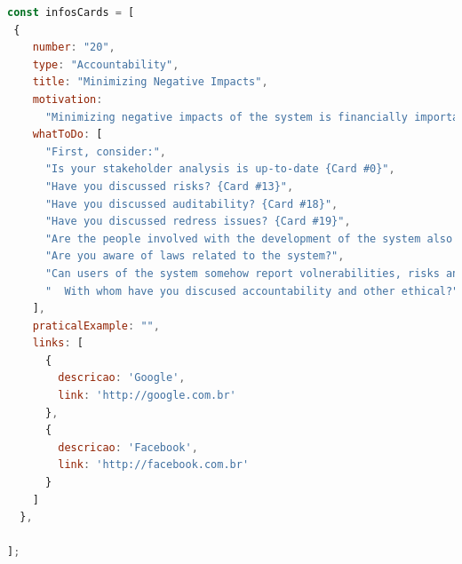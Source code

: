 \begin{lstlisting}[language=JavaScript, caption=Informações referentes ao \textit{card} 20 do ECCOLA.]
const infosCards = [
 {
    number: "20",
    type: "Accountability",
    title: "Minimizing Negative Impacts",
    motivation:
      "Minimizing negative impacts of the system is financially important for any developer organization. Incidents are often costly.",
    whatToDo: [
      "First, consider:",
      "Is your stakeholder analysis is up-to-date {Card #0}",
      "Have you discussed risks? {Card #13}",
      "Have you discussed auditability? {Card #18}",
      "Have you discussed redress issues? {Card #19}",
      "Are the people involved with the development of the system also involved with the development of the system also involved with it during its operational life? If not, they may not feel as accountable.",
      "Are you aware of laws related to the system?",
      "Can users of the system somehow report volnerabilities, risks and other issues in the system?",
      "  With whom have you discused accountability and other ethical?",
    ],
    praticalExample: "",
    links: [
      {
        descricao: 'Google',
        link: 'http://google.com.br'
      },
      {
        descricao: 'Facebook',
        link: 'http://facebook.com.br'
      }
    ]
  },
    
];
\end{lstlisting}

